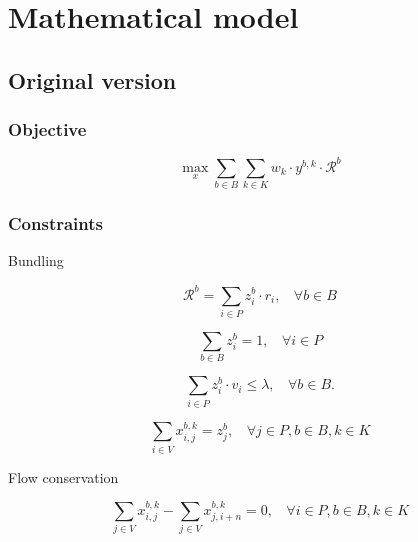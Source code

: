 \documentclass[12pt ]{article}
\begin{document}
\setcounter{secnumdepth}{0} %

\section{Mathematical model}

\subsection{Original version}
\subsubsection{Objective}

\begin{equation}
	\max_x \sum_{b \in B} \sum_{k \in K} w_k \cdot y^{b,k} \cdot \mathcal{R}^b
	\label{eq:objective}	
\end{equation}
\vspace{0.5cm}

\subsubsection{Constraints}


Bundling

\begin{equation}
	\mathcal{R}^b = \sum_{i \in P} z_i^b \cdot r_i,~~~~\forall b \in B
	\label{eq:bundleReward}
\end{equation}

\begin{equation}
	\sum_{b \in B} z_i^b = 1,~~~~\forall i \in P
	\label{eq:taskMembership}
\end{equation}

\begin{equation}
	\sum_{i \in P} z_i^b \cdot v_i \le \lambda,~~~~\forall b \in B.
	\label{eq:volThreshold}
\end{equation}

\begin{equation}
	\sum_{i \in V} x_{i,j}^{b,k} = z_j^b,~~~~\forall j \in P, b \in B, k \in K
	\label{eq:enforce}
\end{equation}


Flow conservation

\begin{equation}
	\sum_{j \in V} x_{i,j}^{b,k} - \sum_{j \in V} x_{j,i+n}^{b,k} = 0,~~~~\forall i \in P, b \in B, k \in K
	\label{eq:dIfP}
\end{equation}
\end{document}

